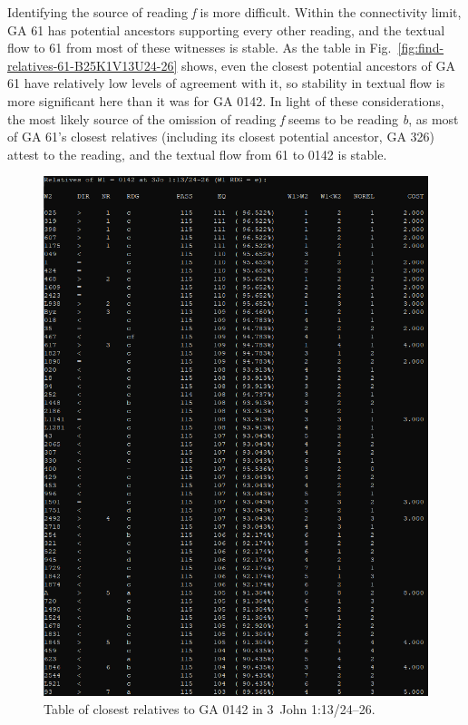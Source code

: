 \documentclass[a4paper, 12pt]{article}
\begin{document}
	Identifying the source of reading \emph{f} is more difficult. Within the connectivity limit, GA 61 has potential ancestors supporting every other reading, and the textual flow to 61 from most of these witnesses is stable. As the table in Fig.~\ref{fig:find-relatives-61-B25K1V13U24-26} shows, even the closest potential ancestors of GA 61 have relatively low levels of agreement with it, so stability in textual flow is more significant here than it was for GA 0142. In light of these considerations, the most likely source of the omission of reading \emph{f} seems to be reading \emph{b}, as most of GA 61's closest relatives (including its closest potential ancestor, GA 326) attest to the reading, and the textual flow from 61 to 0142 is stable.
	
	\begin{figure}[h!]
		\centering
		\includegraphics[width=\textwidth]{../graphics/find-relatives-0142-B25K1V13U24-26.png}
		\caption{Table of closest relatives to GA 0142 in 3~John 1:13/24–26.}
		\label{fig:find-relatives-0142-B25K1V13U24-26}
	\end{figure}
	
\end{document}
